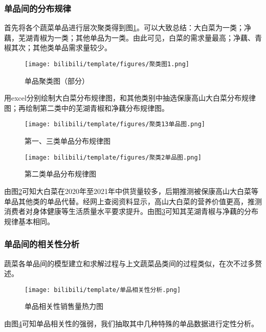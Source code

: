 \documentclass[withoutpreface,bwprint]{cumcmthesis} %
\begin{document}
\subsubsection{单品间的分布规律}
首先将各个蔬菜单品进行层次聚类得到图\ref{单品聚类图}。可以大致总结：大白菜为一类；净藕，芜湖青椒为一类；其他单品为一类。由此可见，白菜的需求量最高；净藕、青椒其次；其他类单品需求量较少。
\begin{figure}[H]%
	\centering
	\texttt{[image: bilibili/template/figures/聚类图1.png]}%
    \caption{单品聚类图（部分）}
    \label{单品聚类图}%
\end{figure}
用excel分别绘制大白菜分布规律图，和其他类别中抽选保康高山大白菜分布规律图；再绘制第二类中的芜湖青椒和净藕分布规律图。
\begin{figure}[H]%
	\centering
	\texttt{[image: bilibili/template/figures/聚类13单品图.png]}%
    \caption{第一、三类单品分布规律图}
    \label{聚类1图}%
\end{figure}
\begin{figure}[H]%
	\centering
	\texttt{[image: bilibili/template/figures/聚类2单品图.png]}%
    \caption{第二类单品分布规律图}
    \label{聚类2图}%
\end{figure} 
由图\ref{聚类1图}可知大白菜在2020年至2021年中供货量较多，后期推测被保康高山大白菜等单品其他类的单品代替。经网上查阅资料显示，高山大白菜的营养价值更高，推测消费者对身体健康等生活质量水平要求提升。由图\ref{聚类2图}可知其芜湖青椒与净藕的分布规律基本相同。

\subsubsection{单品间的相关性分析}
蔬菜各单品间的模型建立和求解过程与上文蔬菜品类间的过程类似，在次不过多赘述。
\begin{figure}[H]%
	\centering
	\texttt{[image: bilibili/template/单品相关性分析.png]}%
    \caption{单品相关性销售量热力图}
    \label{单品相关性销售热力图}%
\end{figure}
由图\ref{单品相关性销售热力图}可知单品相关性的强弱，我们抽取其中几种特殊的单品数据进行定性分析。
\end{document}
